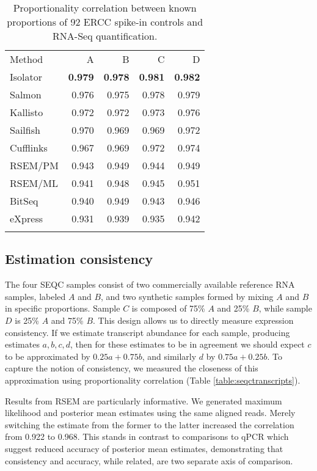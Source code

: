 \documentclass[twocolumn]{article}
\begin{document}
\begin{table}\begin{tabular}[c]{@{}lrrrr@{}}
\toprule\addlinespace
Method & A & B & C & D
\\\addlinespace
\midrule
Isolator & \textbf{0.979} & \textbf{0.978} & \textbf{0.981} &
\textbf{0.982}
\\\addlinespace
Salmon & 0.976 & 0.975 & 0.978 & 0.979
\\\addlinespace
Kallisto & 0.972 & 0.972 & 0.973 & 0.976
\\\addlinespace
Sailfish & 0.970 & 0.969 & 0.969 & 0.972
\\\addlinespace
Cufflinks & 0.967 & 0.969 & 0.972 & 0.974
\\\addlinespace
RSEM/PM & 0.943 & 0.949 & 0.944 & 0.949
\\\addlinespace
RSEM/ML & 0.941 & 0.948 & 0.945 & 0.951
\\\addlinespace
BitSeq & 0.940 & 0.949 & 0.943 & 0.946
\\\addlinespace
eXpress & 0.931 & 0.939 & 0.935 & 0.942
\\\addlinespace
\bottomrule
\addlinespace
\end{tabular}
\caption{Proportionality correlation between known proportions of 92
ERCC spike-in controls and RNA-Seq quantification.}
\label{table:ercc}
\end{table}

\subsection{Estimation consistency}\label{estimation-consistency}

The four SEQC samples consist of two commercially available reference RNA
samples, labeled $A$ and $B$, and two synthetic samples formed by mixing $A$ and
$B$ in specific proportions. Sample $C$ is composed of 75\% $A$ and 25\% $B$,
while sample $D$ is 25\% $A$ and 75\% $B$. This design allows us to directly
measure expression consistency. If we estimate transcript abundance for each
sample, producing estimates $a, b, c, d$, then for these estimates to be in
agreement we should expect $c$ to be approximated by $0.25a + 0.75b$, and
similarly $d$ by $0.75a + 0.25b$. To capture the notion of consistency, we
measured the closeness of this approximation using proportionality correlation
(Table \ref{table:seqctranscripts}).

Results from RSEM are particularly informative. We generated maximum
likelihood and posterior mean estimates using the same aligned reads.
Merely switching the estimate from the former to the latter increased
the correlation from 0.922 to 0.968. This stands in contrast to
comparisons to qPCR which suggest reduced accuracy of posterior mean
estimates, demonstrating that consistency and accuracy, while related,
are two separate axis of comparison.
\end{document}

